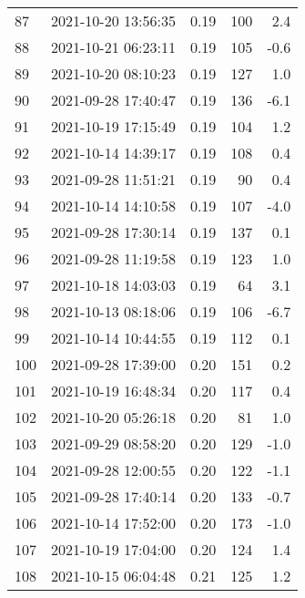 \begin{tabular}{llrrr}
87  & 2021-10-20 13:56:35 &  0.19 &             100 &                    2.4 \\
88  & 2021-10-21 06:23:11 &  0.19 &             105 &                   -0.6 \\
89  & 2021-10-20 08:10:23 &  0.19 &             127 &                    1.0 \\
90  & 2021-09-28 17:40:47 &  0.19 &             136 &                   -6.1 \\
91  & 2021-10-19 17:15:49 &  0.19 &             104 &                    1.2 \\
92  & 2021-10-14 14:39:17 &  0.19 &             108 &                    0.4 \\
93  & 2021-09-28 11:51:21 &  0.19 &              90 &                    0.4 \\
94  & 2021-10-14 14:10:58 &  0.19 &             107 &                   -4.0 \\
95  & 2021-09-28 17:30:14 &  0.19 &             137 &                    0.1 \\
96  & 2021-09-28 11:19:58 &  0.19 &             123 &                    1.0 \\
97  & 2021-10-18 14:03:03 &  0.19 &              64 &                    3.1 \\
98  & 2021-10-13 08:18:06 &  0.19 &             106 &                   -6.7 \\
99  & 2021-10-14 10:44:55 &  0.19 &             112 &                    0.1 \\
100 & 2021-09-28 17:39:00 &  0.20 &             151 &                    0.2 \\
101 & 2021-10-19 16:48:34 &  0.20 &             117 &                    0.4 \\
102 & 2021-10-20 05:26:18 &  0.20 &              81 &                    1.0 \\
103 & 2021-09-29 08:58:20 &  0.20 &             129 &                   -1.0 \\
104 & 2021-09-28 12:00:55 &  0.20 &             122 &                   -1.1 \\
105 & 2021-09-28 17:40:14 &  0.20 &             133 &                   -0.7 \\
106 & 2021-10-14 17:52:00 &  0.20 &             173 &                   -1.0 \\
107 & 2021-10-19 17:04:00 &  0.20 &             124 &                    1.4 \\
108 & 2021-10-15 06:04:48 &  0.21 &             125 &                    1.2 \\

\end{tabular}
